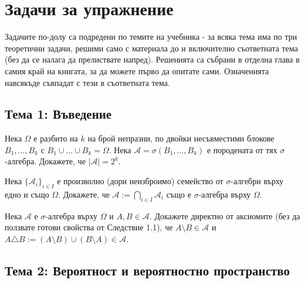 \chapter*{Задачи за упражнение}

\begin{rembox}
Задачите по-долу са подредени по темите на учебника - за всяка тема
има по три теоретични задачи, решими само с материала до и включително
съответната тема (без да се налага да прелиствате напред). Решенията
са събрани в отделна глава в самия край на книгата, за да можете
първо да опитате сами. Означенията навсякъде съвпадат с тези в
съответната тема.
\end{rembox}

\section*{Тема 1: Въведение}

\begin{probbox}[Задача 1.1]
Нека $\Omega$ е разбито на $k$ на брой непразни, по двойки
несъвместими блокове $B_1,\dots,B_k$ с $B_1\cup\dots\cup B_k=\Omega$.
Нека $\mathcal A=\sigma(B_1,\dots,B_k)$ е породената от тях
$\sigma$-алгебра. Докажете, че $|\mathcal A|=2^k$.
\end{probbox}

\begin{probbox}[Задача 1.2]
Нека $\{\mathcal A_i\}_{i\in I}$ е произволно (дори неизброимо)
семейство от $\sigma$-алгебри върху едно и също $\Omega$. Докажете,
че $\mathcal A:=\bigcap_{i\in I}\mathcal A_i$ също е $\sigma$-алгебра
върху $\Omega$.
\end{probbox}

\begin{probbox}[Задача 1.3]
Нека $\mathcal A$ е $\sigma$-алгебра върху $\Omega$ и $A,B\in
\mathcal A$. Докажете директно от аксиомите (без да ползвате готови
свойства от Следствие 1.1), че $A\setminus B\in\mathcal A$ и
$A\triangle B:=(A\setminus B)\cup(B\setminus A)\in\mathcal A$.
\end{probbox}

\section*{Тема 2: Вероятност и вероятностно пространство}

